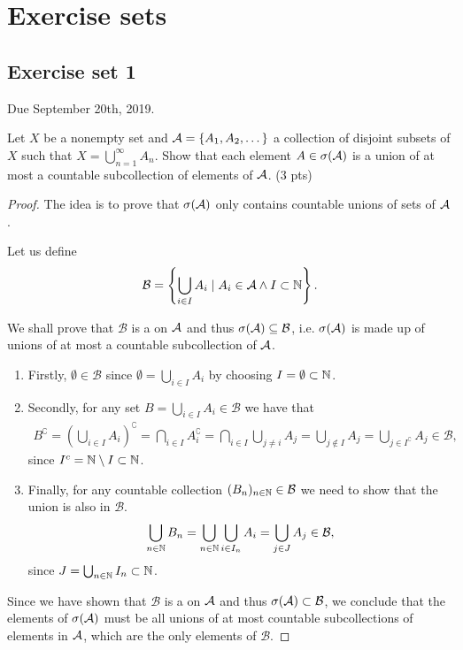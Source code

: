 

\chapter{Exercise sets}

\section{Exercise set 1}

Due September 20th, 2019.


\newcommand{\calB}{\mathcal{B}}
\begin{ex}
	Let $X$ be a nonempty set and $\mathcal{A} = \{A_1, A_2, \dots\}$ a collection of disjoint subsets of $X$ such that $X = \bigcup_{n = 1}^\infty A_n$. Show that each element $A \in \sigma(\mathcal{A})$ is a union of at most a countable subcollection of elements of $\mathcal{A}$. (3 pts)
\end{ex}

\begin{proof}
	The idea is to prove that $\sigma(\mathcal{A})$ only contains countable unions of sets of $\mathcal{A}$.
	
	Let us define
	\begin{align*}
		\calB = \left\{\bigcup_{i \in I} A_i \mid A_i \in \sa \land I \subset \N\right\}.
	\end{align*}
	
	We shall prove that $\calB$ is a \siga on $\mathcal{A}$ and thus $\sigma (\sa) \subseteq \calB$, i.e. $\sigma(\mathcal{A})$ is made up of unions of at most a countable subcollection of $\mathcal{A}$.
	
	\begin{enumerate}
		\item Firstly, $\emptyset \in \calB$ since $\emptyset = \bigcup_{i \in I} A_i$ by choosing $I = \emptyset \subset \mathbb{N}$.
		\item Secondly, for any set $B = \bigcup_{i \in I} A_i \in \calB$ we have that
		\begin{align*}
			B^\complement = \left(\bigcup_{i \in I} A_i\right)^\complement = \bigcap_{i \in I} A_i^\complement = \bigcap_{i \in I} \bigcup_{j \neq i} A_j = \bigcup_{j \not\in I} A_j = \bigcup_{j \in I^\complement} A_j \in \calB,
		\end{align*}
		since $I^c = \mathbb{N} \setminus I \subset \mathbb{N}$.
		
		\item Finally, for any countable collection $(B_n)_{n \in \N} \in \calB$ we need to show that the union is also in $\calB$.
		\begin{align*}
			\bigcup_{n\in\N} B_n = \bigcup_{n\in\N} \bigcup_{i \in I_n} A_i = \bigcup_{j \in J} A_j \in \calB,
		\end{align*}
		since $J = \bigcup_{n \in \mathbb{N}} I_n \subset \mathbb{N}$.
	\end{enumerate}
	Since we have shown that $\calB$ is a \siga on $\mathcal{A}$ and thus $\sigma(\sa) \subset \calB$, we conclude that the elements of $\sigma(\mathcal{A})$ must be all unions of at most countable subcollections of elements in $\mathcal{A}$, which are the only elements of $\calB$.
\end{proof}

